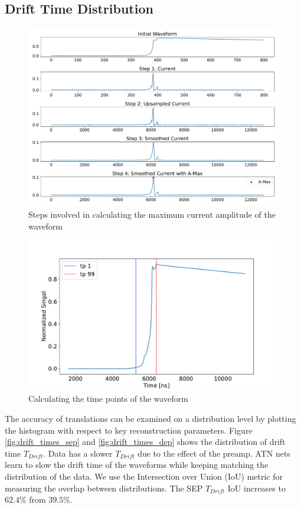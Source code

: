 \subsection{Drift Time Distribution}
\begin{figure}[htb!]
    \centering
    \includegraphics[width=0.99\linewidth]{ch8/figs/curr_amp_calc.pdf}
    \caption{Steps involved in calculating the maximum current amplitude of the waveform}
    \label{fig:ch8:curr_amp_calc}
\end{figure}

\begin{figure}[htb!]
    \centering
    \includegraphics[width=0.99\linewidth]{ch8/figs/time_calc.pdf}
    \caption{Calculating the time points of the waveform}
    \label{fig:ch8:time_calc}
\end{figure}


 The accuracy of translations can be examined on a distribution level by plotting the histogram with respect to key reconstruction parameters. Figure \ref{fig:drift_times_sep} and \ref{fig:drift_times_dep} shows the distribution of drift time $T_{Drift}$. Data has a slower $T_{Drift}$ due to the effect of the preamp. ATN nets learn to slow the drift time of the waveforms while keeping matching the distribution of the data. We use the Intersection over Union (IoU) metric for measuring the overlap between distributions. The SEP $T_{Drift}$ IoU increases to $62.4\%$ from $39.5\%$.
 
